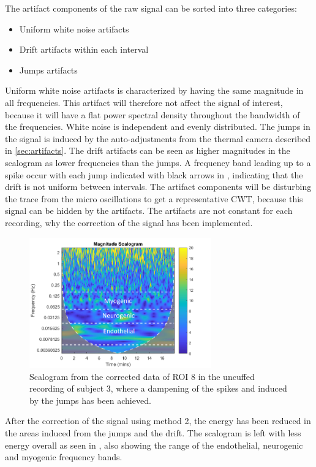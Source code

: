 The artifact components of the raw signal can be sorted into three categories: 
\begin{itemize}
	\item Uniform white noise artifacts
    \item Drift artifacts within each interval
	\item Jumps artifacts
\end{itemize}

Uniform white noise artifacts is characterized by having the same magnitude in all frequencies. This artifact will therefore not affect the signal of interest, because it will have a flat power spectral density throughout the bandwidth of the frequencies. White noise is independent and evenly distributed\cite{hida2014}. 
The jumps in the signal is induced by the auto-adjustments from the thermal camera described in \ref{sec:artifacts}. The drift artifacts can be seen as higher magnitudes in the scalogram as lower frequencies than the jumps. A frequency band leading up to a spike occur with each jump indicated with black arrows in , indicating that the drift is not uniform between intervals.
The artifact components will be disturbing the trace from the micro oscillations to get a representative CWT, because this signal can be hidden by the artifacts. The artifacts are not constant for each recording, why the correction of the signal has been implemented.

\begin{figure}[H]
	\includegraphics[width=0.7\textwidth]{figures/cwt_sub3_reg8_corr_uncuffed}
	\caption{Scalogram from the corrected data of ROI 8 in the uncuffed recording of subject 3, where a dampening of the spikes and  induced by the jumps has been achieved.}
	\label{fig:scalogram_corr}
\end{figure} 

After the correction of the signal using method 2, the energy has been reduced in the areas induced from the jumps and the drift. The scalogram is left with less energy overall as seen in , also showing the range of the endothelial, neurogenic and myogenic frequency bands. %

